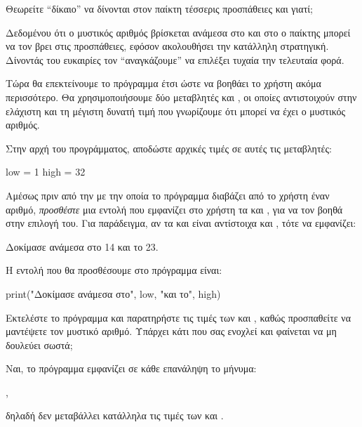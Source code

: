 \documentclass[a4paper,11pt,oneside]{book}
\begin{document}
\begin{step}
Θεωρείτε ``δίκαιο'' να δίνονται στον παίκτη τέσσερις προσπάθειες και γιατί;

\begin{answer}
Δεδομένου ότι ο μυστικός αριθμός βρίσκεται ανάμεσα στο  και στο  ο παίκτης μπορεί να τον βρει στις  προσπάθειες, εφόσον ακολουθήσει την κατάλληλη στρατηγική. Δίνοντάς του  ευκαιρίες τον ``αναγκάζουμε'' να επιλέξει τυχαία την τελευταία φορά.
\end{answer}
\end{step}

\begin{step}
Τώρα θα επεκτείνουμε το πρόγραμμα έτσι ώστε να βοηθάει το χρήστη ακόμα περισσότερο. Θα χρησιμοποιήσουμε δύο μεταβλητές  και , οι οποίες αντιστοιχούν στην ελάχιστη και τη μέγιστη δυνατή τιμή που γνωρίζουμε ότι μπορεί να έχει ο μυστικός αριθμός. 

Στην αρχή του προγράμματος, αποδώστε αρχικές τιμές σε αυτές τις μεταβλητές:

\begin{pynew}
low = 1
high = 32
\end{pynew}
\end{step}

\begin{step}
Αμέσως πριν από την  με την οποία το πρόγραμμα διαβάζει από το χρήστη έναν αριθμό, \emph{προσθέστε} μια εντολή που εμφανίζει στο χρήστη τα  και , για να τον βοηθά στην επιλογή του. Για παράδειγμα, αν τα  και  είναι αντίστοιχα  και , τότε να εμφανίζει:

\marginnote[24pt]{\iconcomputer}
\begin{pyterm}
Δοκίμασε ανάμεσα στο 14 και το 23.
\end{pyterm}

\begin{answer}
Η εντολή που θα προσθέσουμε στο πρόγραμμα είναι:
	
\begin{pynew}
print("Δοκίμασε ανάμεσα στο", low, "και το", high)
\end{pynew}
\end{answer}

Εκτελέστε το πρόγραμμα και παρατηρήστε τις τιμές των  και , καθώς προσπαθείτε να μαντέψετε τον μυστικό αριθμό. Υπάρχει κάτι που σας ενοχλεί και φαίνεται να μη δουλεύει σωστά;

\begin{answer}
Ναι, το πρόγραμμα εμφανίζει σε κάθε επανάληψη το μήνυμα:
	
, 
	
δηλαδή δεν μεταβάλλει κατάλληλα τις τιμές των  και .
\end{answer}
\end{step}
\end{document}
